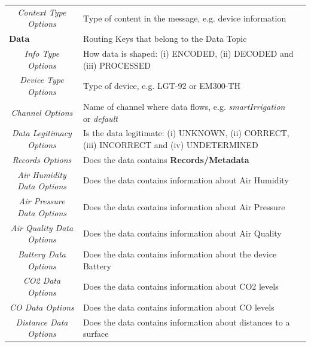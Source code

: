 \begin{landscape}
\begin{longtable}{cll}
   \textit{Context Type Options}           & Type of content in the message, e.g. device information                                                   &  \\ \cline{1-2}
   \multicolumn{1}{l}{\textbf{Data}}       & Routing Keys that belong to the Data Topic                                                                &  \\
   \textit{Info Type Options}              & How data is shaped: (i) ENCODED, (ii) DECODED and (iii) PROCESSED                                         &  \\
   \textit{Device Type Options}            & Type of device, e.g. LGT-92 or EM300-TH                                                                   &  \\
   \textit{Channel Options}                & Name of channel where data flows, e.g. \textit{smartIrrigation} or \textit{default}                       &  \\
   \textit{Data Legitimacy Options}        & Is the data legitimate: (i) UNKNOWN, (ii) CORRECT, (iii) INCORRECT and (iv) UNDETERMINED      &  \\
   \textit{Records Options}                & Does the data contains \textbf{Records/Metadata}\footnotemark[1]                                          &  \\
   \textit{Air Humidity Data Options}      & Does the data contains information about Air Humidity\footnotemark[1]\footnotemark[2]                     &  \\
   \textit{Air Pressure Data Options}      & Does the data contains information about Air Pressure\footnotemark[1]\footnotemark[2]                     &  \\
   \textit{Air Quality Data Options}       & Does the data contains information about Air Quality\footnotemark[1]\footnotemark[2]                      &  \\
   \textit{Battery Data Options}           & Does the data contains information about the device Battery\footnotemark[1]\footnotemark[2]               &  \\
   \textit{CO2 Data Options}               & Does the data contains information about CO2 levels\footnotemark[1]\footnotemark[2]                       &  \\
   \textit{CO Data Options}                & Does the data contains information about CO levels\footnotemark[1]\footnotemark[2]                        &  \\
   \textit{Distance Data Options}          & Does the data contains information about distances to a surface\footnotemark[1]\footnotemark[2]           &  \\

\end{longtable}
\end{landscape}
